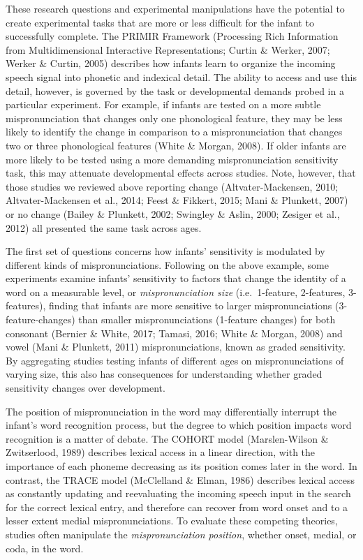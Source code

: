 \documentclass[
  english,
  man, noextraspace]{apa6}
\begin{document}
These research questions and experimental manipulations have the potential to create experimental tasks that are more or less difficult for the infant to successfully complete. The PRIMIR Framework (Processing Rich Information from Multidimensional Interactive Representations; Curtin \& Werker, 2007; Werker \& Curtin, 2005) describes how infants learn to organize the incoming speech signal into phonetic and indexical detail. The ability to access and use this detail, however, is governed by the task or developmental demands probed in a particular experiment. For example, if infants are tested on a more subtle mispronunciation that changes only one phonological feature, they may be less likely to identify the change in comparison to a mispronunciation that changes two or three phonological features (White \& Morgan, 2008). If older infants are more likely to be tested using a more demanding mispronunciation sensitivity task, this may attenuate developmental effects across studies. Note, however, that those studies we reviewed above reporting change (Altvater-Mackensen, 2010; Altvater-Mackensen et al., 2014; Feest \& Fikkert, 2015; Mani \& Plunkett, 2007) or no change (Bailey \& Plunkett, 2002; Swingley \& Aslin, 2000; Zesiger et al., 2012) all presented the same task across ages.

The first set of questions concerns how infants' sensitivity is modulated by different kinds of mispronunciations. Following on the above example, some experiments examine infants' sensitivity to factors that change the identity of a word on a measurable level, or \emph{mispronunciation size} (i.e.~1-feature, 2-features, 3-features), finding that infants are more sensitive to larger mispronunciations (3-feature-changes) than smaller mispronunciations (1-feature changes) for both consonant (Bernier \& White, 2017; Tamasi, 2016; White \& Morgan, 2008) and vowel (Mani \& Plunkett, 2011) mispronunciations, known as graded sensitivity. By aggregating studies testing infants of different ages on mispronunciations of varying size, this also has consequences for understanding whether graded sensitivity changes over development.

The position of mispronunciation in the word may differentially interrupt the infant's word recognition process, but the degree to which position impacts word recognition is a matter of debate. The COHORT model (Marslen-Wilson \& Zwitserlood, 1989) describes lexical access in a linear direction, with the importance of each phoneme decreasing as its position comes later in the word. In contrast, the TRACE model (McClelland \& Elman, 1986) describes lexical access as constantly updating and reevaluating the incoming speech input in the search for the correct lexical entry, and therefore can recover from word onset and to a lesser extent medial mispronunciations. To evaluate these competing theories, studies often manipulate the \emph{mispronunciation position}, whether onset, medial, or coda, in the word.
\end{document}
